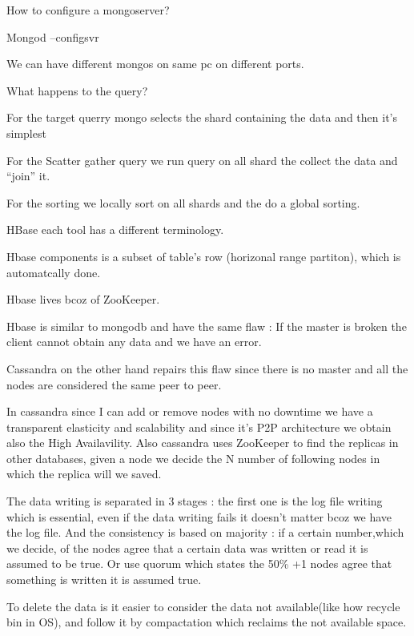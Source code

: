 \documentclass[a4page, 11pt]{article}
\begin{document}
How to configure a mongoserver?

Mongod --configsvr

We can have different mongos on same pc on different ports.

What happens to the query?

For the target querry mongo selects the shard containing the data and
then it's simplest

For the Scatter gather query we run query on all shard the collect the
data and ``join'' it.

For the sorting we locally sort on all shards and the do a global
sorting.

HBase each tool has a different terminology.

Hbase components is a subset of table's row (horizonal range partiton),
which is automatcally done.

Hbase lives bcoz of ZooKeeper.

Hbase is similar to mongodb and have the same flaw : If the master is
broken the client cannot obtain any data and we have an error.

Cassandra on the other hand repairs this flaw since there is no master
and all the nodes are considered the same peer to peer.

In cassandra since I can add or remove nodes with no downtime we have a
transparent elasticity and scalability and since it's P2P architecture
we obtain also the High Availavility. Also cassandra uses ZooKeeper to
find the replicas in other databases, given a node we decide the N
number of following nodes in which the replica will we saved.

The data writing is separated in 3 stages : the first one is the log
file writing which is essential, even if the data writing fails it
doesn't matter bcoz we have the log file. And the consistency is based
on majority : if a certain number,which we decide, of the nodes agree
that a certain data was written or read it is assumed to be true. Or use
quorum which states the 50\% +1 nodes agree that something is written it
is assumed true.

To delete the data is it easier to consider the data not available(like
how recycle bin in OS), and follow it by compactation which reclaims the
not available space.
\end{document}
